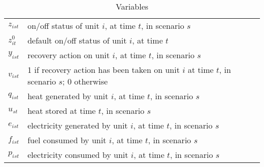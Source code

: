 \documentclass[a4paper,11pt,italian]{article}
\theoremstyle{changebreak}                %
\begin{document}
\begin{table}[h]
    \caption{Variables}
\begin{tabular}{l l}
    $z_{ist}$ & on/off status of unit $i$, at time $t$, in scenario $s$\\
    $z_{it}^0$ & default on/off status of unit $i$, at time $t$\\
    $y_{ist}$ & recovery action on unit $i$, at time $t$, in scenario $s$\\
    $v_{ist}$ & 1 if recovery action has been taken on unit $i$ at time $t$, in scenario $s$; 0 otherwise\\
    $q_{ist}$ & heat generated by unit $i$, at time $t$, in scenario $s$\\
    $u_{st}$ & heat stored at time $t$, in scenario $s$\\
    $e_{ist}$ & electricity generated by unit $i$, at time $t$, in scenario $s$\\
    $f_{ist}$ & fuel consumed by unit $i$, at time $t$, in scenario $s$\\
    $p_{ist}$ & electricity consumed by unit $i$, at time $t$, in scenario $s$
\end{tabular}
\end{table}
\end{document}
